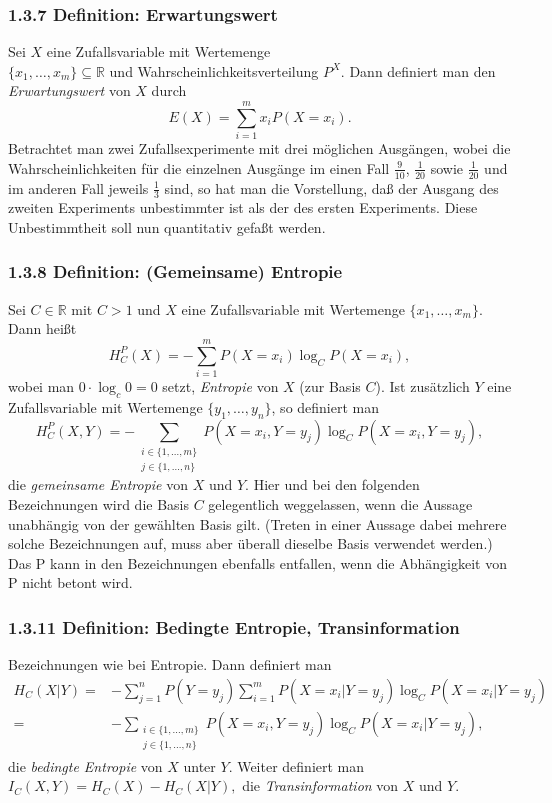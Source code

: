 \documentclass[12pt,a4paper]{scrartcl}
\begin{document}
            \subsubsection*{1.3.7 Definition: Erwartungswert}
                Sei $X$ eine Zufallsvariable mit Wertemenge \\ $\lbrace x_1,\dots , x_m \rbrace \subseteq \mathbb{R}$ und Wahrscheinlichkeitsverteilung $P^X$. Dann definiert man den \emph{Erwartungswert} von $X$ durch \[E(X)=\sum_{i=1}^{m}x_i P(X=x_i).\] Betrachtet man zwei Zufallsexperimente mit drei möglichen Ausgängen, wobei die Wahrscheinlichkeiten für die einzelnen Ausgänge im einen Fall $\frac{9}{10}$, $\frac{1}{20}$ sowie $\frac{1}{20}$ und im anderen Fall jeweils $\frac{1}{3}$ sind, so hat man die Vorstellung, daß der Ausgang des zweiten Experiments unbestimmter ist als der des ersten Experiments. Diese Unbestimmtheit soll nun quantitativ gefaßt werden.
            \subsubsection*{1.3.8 Definition: (Gemeinsame) Entropie}
                Sei $C \in \mathbb{R}$ mit $C > 1$ und $X$ eine Zufallsvariable mit Wertemenge $\lbrace x_1,\dots,x_m \rbrace$. Dann heißt \[H_C^P(X)=-\sum_{i=1}^m P(X=x_i) \log_C P(X=x_i),\]wobei man $0 \cdot \log_c 0 = 0$ setzt, \emph{Entropie} von $X$ (zur Basis $C$). Ist zusätzlich $Y$ eine Zufallsvariable mit Wertemenge $\lbrace y_1, \dots, y_n \rbrace$, so definiert man \[H_C^P (X,Y)=- \sum_{\substack{i \in \lbrace 1, \dots, m \rbrace \\ j \in \lbrace 1, \dots, n \rbrace}} P(X=x_i, Y=y_j) \log_C P(X=x_i,Y=y_j),\] die \emph{gemeinsame Entropie} von $X$ und $Y$. Hier und bei den folgenden Bezeichnungen wird die
                Basis $C$ gelegentlich weggelassen, wenn die Aussage unabhängig von der gewählten Basis gilt. (Treten in einer Aussage dabei mehrere solche Bezeichnungen auf, muss aber überall dieselbe Basis verwendet werden.) Das P kann in den Bezeichnungen ebenfalls entfallen, wenn die Abhängigkeit von P nicht betont wird.
            \subsubsection*{1.3.11 Definition: Bedingte Entropie, Transinformation}
                Bezeichnungen wie bei Entropie. Dann definiert man 
                \begin{align*}
                    H_C(X|Y)  = & - \sum_{j=1}^{n}P(Y=y_j) \sum_{i=1}^{m}P(X=x_i|Y=y_j) \log_C P(X=x_i|Y=y_j) \\
                    = & - \sum_{\substack{i \in \lbrace 1, \dots, m \rbrace \\ j \in \lbrace 1, \dots, n \rbrace}} P(X=x_i,Y=y_j) \log_C P(X=x_i|Y=y_j),
                \end{align*}
                die \emph{bedingte Entropie} von $X$ unter $Y$. Weiter definiert man $I_C(X,Y)=H_C(X)-H_C(X|Y),$ die \emph{Transinformation} von $X$ und $Y$.
\end{document}
